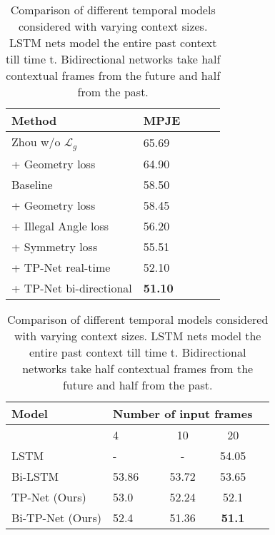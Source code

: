 \documentclass[runningheads]{llncs}
\begin{document}
	 
\begin{table}[!bht]
\centering
\footnotesize
\parbox{.40\linewidth}{

\begin{tabular}{ l  l  c  c c  }
{\bf Method} & {\bf MPJE}\\
\hline
Zhou w/o $\mathcal{L}_g$~\cite{Zhou_2017_ICCV}& 65.69\\
 + Geometry loss & 64.90\\
\hline
Baseline & 58.50\\
 + Geometry loss & 58.45\\ 
 + Illegal Angle loss & 56.20\\
 + Symmetry loss & 55.51\\
 + TP-Net real-time & 52.10\\
 + TP-Net bi-directional & \textbf{51.10}\\
\hline
\end{tabular} 
\vskip 2mm
\caption{Ablation of different loss terms on Human3.6M using Protocol 1.}
\label{tab:ablation}
}
\hspace{1em}
\parbox{.45\linewidth}{

  \begin{tabular}{l  l  c  c c  }
     {\bf Model} &
      \multicolumn{3}{c}{\bf Number of input frames} \\
      \hline
      & 4 & 10 & 20\\
    \hline
    LSTM & - & - & 54.05 \\
    Bi-LSTM & 53.86 & 53.72 & 53.65 \\
    TP-Net (Ours) & 53.0 & 52.24 & 52.1 \\
    Bi-TP-Net (Ours) & 52.4 & 51.36 & \textbf{51.1} \\
    \hline
  \end{tabular}
\vskip 2mm
\caption{Comparison of different temporal models considered with varying context sizes. LSTM nets model the entire past context till time t. Bidirectional networks take half contextual frames from the future and half from the past.}
\label{tab:lstmComp}
}\\
\end{table}

\end{document}
